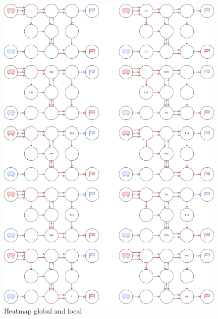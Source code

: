 \begin{figure}[H]
    \centering
    \caption{Heatmap global and local}\label{apx:heatmap_and_global}
    \includegraphics[width=12cm]{img/heatmap_and_global.drawio.png}
\end{figure}